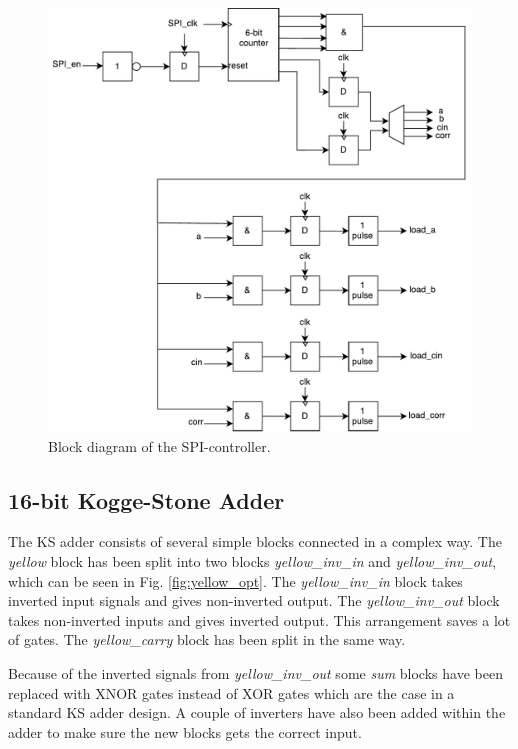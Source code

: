 \begin{figure}[H]
	\centering
	\captionsetup{justification=centering}
	\includegraphics[scale=0.5]{../figures/SPI_controller.pdf}
	\caption{Block diagram of the SPI-controller.} \label{fig:spi_controller}
\end{figure}

\subsection{16-bit Kogge-Stone Adder}
The KS adder consists of several simple blocks connected in a complex way. The \textit{yellow} block has been split into two blocks \textit{yellow\_inv\_in} and \textit{yellow\_inv\_out}, which can be seen in Fig. \ref{fig:yellow_opt}. The \textit{yellow\_inv\_in} block takes inverted input signals and gives non-inverted output. The \textit{yellow\_inv\_out} block takes non-inverted inputs and gives inverted output. This arrangement saves a lot of gates. The \textit{yellow\_carry} block has been split in the same way. 

Because of the inverted signals from \textit{yellow\_inv\_out} some \textit{sum} blocks have been replaced with XNOR gates instead of XOR gates which are the case in a standard KS adder design. A couple of inverters have also been added within the adder to make sure the new blocks gets the correct input.

